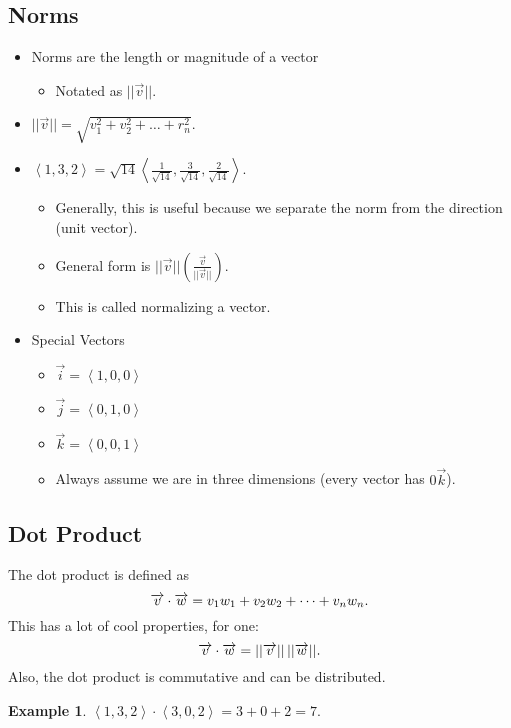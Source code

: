 \documentclass[12pt]{article}
\theoremstyle{plain} %
\theoremstyle{definition}
\theoremstyle{definition}
\newtheorem{exmp}{Example}[section]
\theoremstyle{remark}
\newcommand{\angled}[1]{\left\langle {#1} \right\rangle}
\newcommand*{\vv}[1]{\overrightarrow{\mkern0mu#1}}
\begin{document}
\subsection{Norms}
\begin{itemize}
    \item Norms are the length or magnitude of a vector
    \begin{itemize}
        \item Notated as $||\overrightarrow{v}||$.
    \end{itemize}
    \item $|| \overrightarrow{v} || = \sqrt{v_1^2 + v_2^2 + \dots + r_n^2}$.
    \item $\angled{1,3,2} = \sqrt{14} \angled{\frac{1}{\sqrt{14}},\frac{3}{\sqrt{14}},\frac{2}{\sqrt{14}}}$.
    \begin{itemize}
        \item Generally, this is useful because we separate the norm from the direction (unit vector).
        \item General form is $|| \vec{v} || (\frac{\vec{v}}{||\vec{v}||})$.
        \item This is called normalizing a vector.
    \end{itemize}
    \item Special Vectors
    \begin{itemize}
        \item $\vec{i} = \angled{1,0,0}$
        \item $\vec{j} = \angled{0,1,0}$
        \item $\vec{k} = \angled{0,0,1}$
        \item Always assume we are in three dimensions (every vector has $0\overrightarrow{k}$).
    \end{itemize}
\end{itemize}

\subsection{Dot Product}
The dot product is defined as
\[ \vv{v} \cdot \vv{w} = v_1w_1 + v_2w_2 + \dots + v_nw_n. \]
This has a lot of cool properties, for one: \[\vv{v} \cdot \vv{w} = ||\vv{v}||\,||\vv{w}||.\]
Also, the dot product is commutative and can be distributed.
\begin{exmp}
    $\angled{1,3,2} \cdot \angled{3,0,2} = 3+0+2 = 7$.
\end{exmp}
\end{document}
